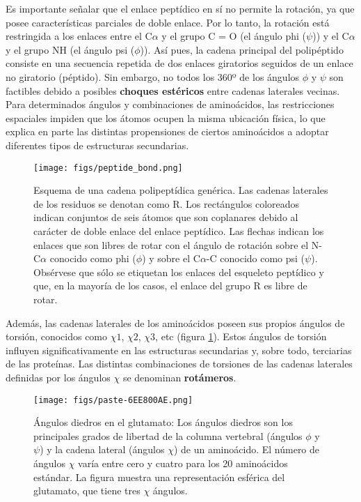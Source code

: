 Es importante señalar que el enlace peptídico en sí no permite la rotación, ya que posee características parciales de doble enlace. Por lo tanto, la rotación está restringida a los enlaces entre el C$\alpha$ y el grupo C = O (el ángulo phi ($\psi$)) y el C$\alpha$ y el grupo NH (el ángulo psi ($\phi$)). Así pues, la cadena principal del polipéptido consiste en una secuencia repetida de dos enlaces giratorios seguidos de un enlace no giratorio (péptido). Sin embargo, no todos los 360º de los ángulos $\phi$ y $\psi$ son factibles debido a posibles \textbf{choques estéricos} entre cadenas laterales vecinas. Para determinados ángulos y combinaciones de aminoácidos, las restricciones espaciales impiden que los átomos ocupen la misma ubicación física, lo que explica en parte las distintas propensiones de ciertos aminoácidos a adoptar diferentes tipos de estructuras secundarias. 

\begin{figure}[h]
\centering
\texttt{[image: figs/peptide\_bond.png]}
\caption{Esquema de una cadena polipeptídica genérica. Las cadenas laterales de los residuos se denotan como R. Los rectángulos coloreados indican conjuntos de seis átomos que son coplanares debido al carácter de doble enlace del enlace peptídico. Las flechas indican los enlaces que son libres de rotar con el ángulo de rotación sobre el N-C$\alpha$ conocido como phi ($\phi$) y sobre el C$\alpha$-C conocido como psi ($\psi$). Obsérvese que sólo se etiquetan los enlaces del esqueleto peptídico y que, en la mayoría de los casos, el enlace del grupo R es libre de rotar.}
\end{figure}

Además, las cadenas laterales de los aminoácidos poseen sus propios ángulos de torsión, conocidos como $\chi1$, $\chi2$, $\chi3$, etc (figura \ref{fig:chi}). Estos ángulos de torsión influyen significativamente en las estructuras secundarias y, sobre todo, terciarias de las proteínas. Las distintas combinaciones de torsiones de las cadenas laterales definidas por los ángulos $\chi$ se denominan \textbf{rotámeros}.

\begin{figure}[h]
\centering
\texttt{[image: figs/paste-6EE800AE.png]}
\caption{Ángulos diedros en el glutamato: Los ángulos diedros son los principales grados de libertad de la columna vertebral (ángulos $\phi$ y $\psi$) y la cadena lateral (ángulos $\chi$) de un aminoácido. El número de ángulos $\chi$ varía entre cero y cuatro para los 20 aminoácidos estándar. La figura muestra una representación esférica del glutamato, que tiene tres $\chi$ ángulos.}
\label{fig:chi}
\end{figure}


